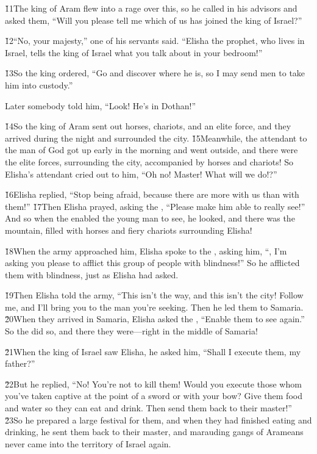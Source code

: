 \v{11}The king of Aram flew into a rage over this, so he called in his advisors and asked them, ``Will you please tell me which of us has joined the king of Israel?''

\v{12}``No, your majesty,'' one of his servants said. ``Elisha the prophet, who lives in Israel, tells the king of Israel what you talk about in your bedroom!''

\v{13}So the king ordered, ``Go and discover where he is, so I may send men to take him into custody.''

Later somebody told him, ``Look! He's in Dothan!''

\v{14}So the king of Aram sent out horses, chariots, and an elite force, and they arrived during the night and surrounded the city. \v{15}Meanwhile, the attendant to the man of God got up early in the morning and went outside, and there were the elite forces, surrounding the city, accompanied by horses and chariots! So Elisha's attendant cried out to him, ``Oh no! Master! What will we do!?''

\v{16}Elisha replied, ``Stop being afraid, because there are more with us than with them!'' \v{17}Then Elisha prayed, asking the , ``Please make him able to really see!'' And so when the  enabled the young man to see, he looked, and there was the mountain, filled with horses and fiery chariots surrounding Elisha!

\v{18}When the army approached him, Elisha spoke to the , asking him, ``, I'm asking you please to afflict this group of people with blindness!'' So he afflicted them with blindness, just as Elisha had asked.

\v{19}Then Elisha told the army, ``This isn't the way, and this isn't the city! Follow me, and I'll bring you to the man you're seeking. Then he led them to Samaria. \v{20}When they arrived in Samaria, Elisha asked the , ``Enable them to see again.'' So the  did so, and there they were---right in the middle of Samaria!

\v{21}When the king of Israel saw Elisha, he asked him, ``Shall I execute them, my father?''

\v{22}But he replied, ``No! You're not to kill them! Would you execute those whom you've taken captive at the point of a sword or with your bow? Give them food and water so they can eat and drink. Then send them back to their master!'' \v{23}So he prepared a large festival for them, and when they had finished eating and drinking, he sent them back to their master, and marauding gangs of Arameans never came into the territory of Israel again.

